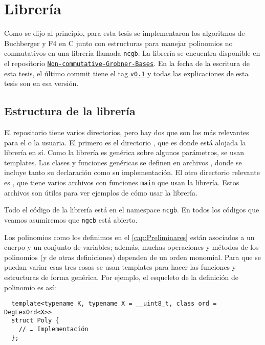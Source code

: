 \documentclass[12pt]{report}
\theoremstyle{customstyle}
\theoremstyle{factstyle}
\newcommand\cpp{C\nolinebreak[4]\hspace{-.05em}\raisebox{.4ex}{\relsize{-3}{\textbf{++}}}\xspace}
\begin{document}
\chapter{Librería}\label{cap:Librería}

Como se dijo al principio, para esta tesis se implementaron los algoritmos de Buchberger y F4 en \cpp junto con estructuras para manejar polinomios no conmutativos en una librería llamada \texttt{ncgb}. La librería se encuentra disponible en el repositorio \href{https://github.com/IvanRenison/Non-commutative-Grobner-Bases}{\texttt{Non-commutative-Grobner-Bases}}. En la fecha de la escritura de esta tesis, el último commit tiene el tag \href{https://github.com/IvanRenison/Non-commutative-Grobner-Bases/tree/v0.1}{\texttt{v0.1}} y todas las explicaciones de esta tesis son en esa versión.

\section{Estructura de la librería}

El repositorio tiene varios directorios, pero hay dos que son los más relevantes para el o la usuaria. El primero es el directorio , que es donde está alojada la librería en sí. Como la librería es genérica sobre algunos parámetros, se usan templates. Las clases y funciones genéricas se definen en archivos , donde se incluye tanto su declaración como su implementación. El otro directorio relevante es , que tiene varios archivos  con funciones \texttt{main} que usan la librería. Estos archivos son útiles para ver ejemplos de cómo usar la librería.

Todo el código de la librería está en el namespace \texttt{ncgb}. En todos los códigos que veamos asumiremos que \texttt{ngcb} está abierto.

Los polinomios como los definimos en el \cref{cap:Preliminares} están asociados a un cuerpo y un conjunto de variables; además, muchas operaciones y métodos de los polinomios (y de otras definiciones) dependen de un orden monomial. Para que se puedan variar esas tres cosas se usan templates para hacer las funciones y estructuras de forma genérica. Por ejemplo, el esqueleto de la definición de polinomio es así: %

\begin{verbatim}
  template<typename K, typename X = __uint8_t, class ord = DegLexOrd<X>>
  struct Poly {
    // … Implementación
  };
\end{verbatim}
\end{document}
